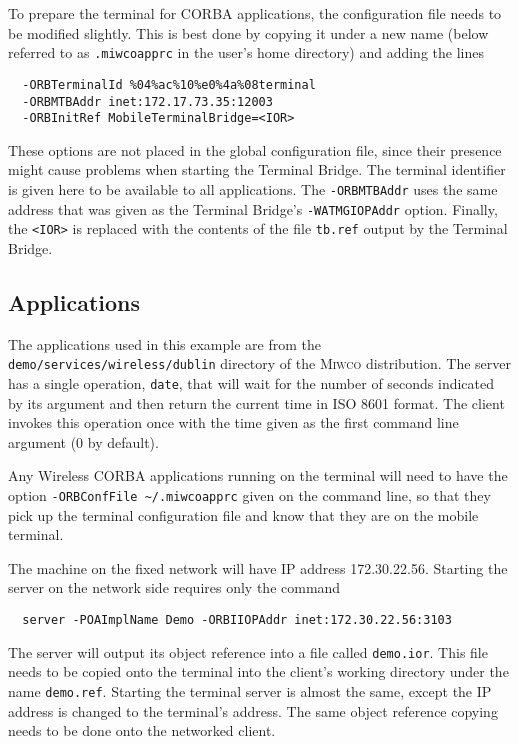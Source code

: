 \documentclass[12pt,a4paper,draft]{article}
\newcommand{\MIWCO}{\textsc{Miwco}}
\begin{document}
To prepare the terminal for CORBA applications, the configuration file
needs to be modified slightly.  This is best done by copying it under
a new name (below referred to as \texttt{.miwcoapprc} in the user's
home directory) and
adding the lines

\small
\begin{verbatim}
  -ORBTerminalId %04%ac%10%e0%4a%08terminal
  -ORBMTBAddr inet:172.17.73.35:12003
  -ORBInitRef MobileTerminalBridge=<IOR>
\end{verbatim}
\normalsize

These options are not placed in the global configuration file, since
their presence might cause problems when starting the Terminal Bridge.
The terminal identifier is given here to be available to all
applications.  The \texttt{-ORBMTBAddr} uses the same address that was
given as the Terminal Bridge's \texttt{-WATMGIOPAddr} option.
Finally, the \texttt{<IOR>} is replaced with the contents of the file
\texttt{tb.ref} output by the Terminal Bridge.

\subsection{Applications}

The applications used in this example are from the
\texttt{demo/services/wireless/dublin} directory of the \MIWCO{}
distribution.
The server has a single operation, \texttt{date}, that will wait for
the number of seconds indicated by its argument and then return the
current time in ISO 8601 format.  The client invokes this operation
once with the time given as the first command line argument (0 by
default).

Any Wireless CORBA applications running on the terminal will need to
have the option \verb+-ORBConfFile ~/.miwcoapprc+ given on the command
line, so that they pick up the terminal configuration file and know
that they are on the mobile terminal.

The machine on the fixed network will have IP address 172.30.22.56.
Starting the server on the network side requires only the command

\small
\begin{verbatim}
  server -POAImplName Demo -ORBIIOPAddr inet:172.30.22.56:3103
\end{verbatim}

The server will output its object reference into a file called
\texttt{demo.ior}.  This file needs to be copied onto the terminal
into the client's working directory under the name \texttt{demo.ref}.
Starting the terminal server is almost the same, except the IP address
is changed to the terminal's address.  The same object reference
copying needs to be done onto the networked client.
\end{document}
